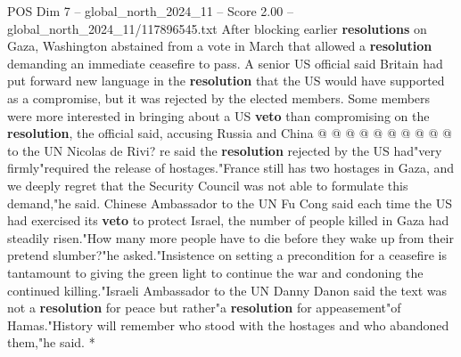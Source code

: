 \begin{textsample}{POS Dim 7 – global\_north\_2024\_11 – Score 2.00 – global\_north\_2024\_11/117896545.txt}
After blocking earlier \textbf{resolutions} on Gaza, Washington abstained from a vote in March that allowed a \textbf{resolution} demanding an immediate ceasefire to pass.
A senior US official said Britain had put forward new language in the \textbf{resolution} that the US would have supported as a compromise, but it was rejected by the elected members.
Some members were more interested in bringing about a US \textbf{veto} than compromising on the \textbf{resolution}, the official said, accusing Russia and China @ @ @ @ @ @ @ @ @ @ to the UN Nicolas de Rivi? re said the \textbf{resolution} rejected by the US had"very firmly"required the release of hostages."France still has two hostages in Gaza, and we deeply regret that the Security Council was not able to formulate this demand,"he said.
Chinese Ambassador to the UN Fu Cong said each time the US had exercised its \textbf{veto} to protect Israel, the number of people killed in Gaza had steadily risen."How many more people have to die before they wake up from their pretend slumber?"he asked."Insistence on setting a precondition for a ceasefire is tantamount to giving the green light to continue the war and condoning the continued killing."Israeli Ambassador to the UN Danny Danon said the text was not a \textbf{resolution} for peace but rather"a \textbf{resolution} for appeasement"of Hamas."History will remember who stood with the hostages and who abandoned them,"he said. *

\end{textsample}
